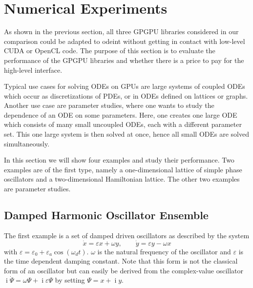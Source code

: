 \documentclass[final]{siamltex}
\newcommand {\ii} {\mathop{i}}
\begin{document}
%
%
\section{Numerical Experiments}

As shown in the previous section, all three GPGPU libraries considered in our comparison
could be adapted to odeint without getting in contact with low-level CUDA or OpenCL code.
The purpose of this section is to evaluate the performance of the GPGPU libraries and whether there is a price to pay for the high-level interface.

Typical use cases for solving ODEs on GPUs are large systems of
coupled ODEs which occur as discretizations of PDEs, or in ODEs
defined on lattices or graphs. Another use case are parameter studies,
where one wants to study the dependence of an ODE on some
parameters. Here, one creates one large ODE which consists of many
small uncoupled ODEs, each with a different parameter set. This one
large system is then solved at once, hence all small ODEs are solved
simultaneously.

In this section we will show four examples and study their
performance. Two examples are of the first type, namely a
one-dimensional lattice of simple phase oscillators and a
two-dimensional Hamiltonian lattice. The other two examples are
parameter studies.







%
%
\subsection{Damped Harmonic Oscillator Ensemble}

The first example is a set of damped driven oscillators as described by the system
\begin{equation} \label{eq:dampedsystem}
    \dot{x} =  \varepsilon x + \omega y , \quad \quad
    \dot{y} =  \varepsilon y - \omega x 
\end{equation}
with $\varepsilon = \varepsilon_0 + \varepsilon_a \cos \left( \omega_d    %
t \right)$. $\omega$ is the natural frequency of the oscillator and
$\varepsilon$ is the time dependent damping constant.  Note that this form is
not the classical form of an oscillator but can easily be derived from the complex-value oscillator $\ii \dot{\Psi} = \omega \Psi + \ii \varepsilon \Psi$ by setting $\Psi = x + \ii y$.
\end{document}
